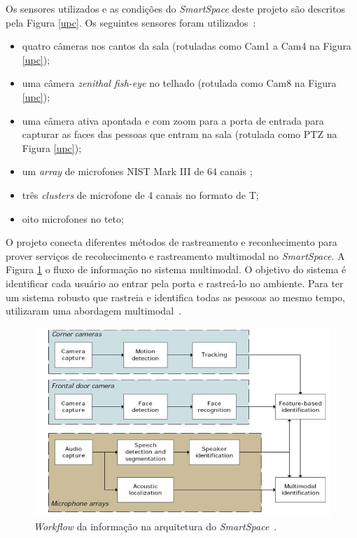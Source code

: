 Os sensores utilizados e as condições do \textit{SmartSpace} deste projeto são descritos pela Figura \ref{upc}. Os seguintes sensores foram utilizados~\cite{salah}:

	\begin{itemize}
		\item quatro câmeras nos cantos da sala (rotuladas como Cam1 a Cam4 na Figura \ref{upc});
		\item uma câmera \textit{zenithal fish-eye} no telhado (rotulada como Cam8 na Figura \ref{upc});
		\item uma câmera ativa apontada e com zoom para a porta de entrada para capturar as faces das pessoas que entram na sala (rotulada como PTZ na Figura \ref{upc});
		\item um \textit{array} de microfones NIST Mark III de 64 canais ;
		\item três \textit{clusters} de microfone de 4 canais no formato de T;
		\item oito microfones no teto;
	\end{itemize}

O projeto conecta diferentes métodos de rastreamento e reconhecimento para prover serviços de recohecimento e rastreamento multimodal no \textit{SmartSpace}. A Figura \ref{workflow} o fluxo de informação no sistema multimodal. O objetivo do sistema é identificar cada usuário ao entrar pela porta e rastreá-lo no ambiente. Para ter um sistema robusto que rastreia e identifica todas as pessoas ao mesmo tempo, utilizaram uma abordagem multimodal~\cite{salah}.

\begin{figure}[hbt]
		\begin{center}
			\includegraphics[scale=0.5]{figuras/3.TrabalhosCorrelatos/workflow.png}
		\end{center}
		\caption{\textit{Workflow} da informação na arquitetura do \textit{SmartSpace}~\cite{salah}.}
		\label{workflow}
	\end{figure}

